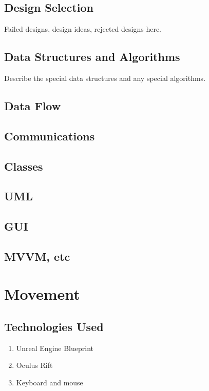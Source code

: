  \subsection{Design Selection}
 Failed designs, design ideas, rejected designs here.
 
 \subsection{Data Structures and Algorithms}
 Describe the special data structures and any special algorithms.
 
 \subsection{Data Flow}
 
 \subsection{Communications}
 
 \subsection{Classes}
 
 \subsection{UML}
 
 \subsection{GUI}
 
 \subsection{MVVM, etc}

\section{ Movement }

\subsection{Technologies  Used}
\begin{enumerate}
	\item Unreal Engine Blueprint
	\item Oculus Rift
	\item Keyboard and mouse
\end{enumerate}

